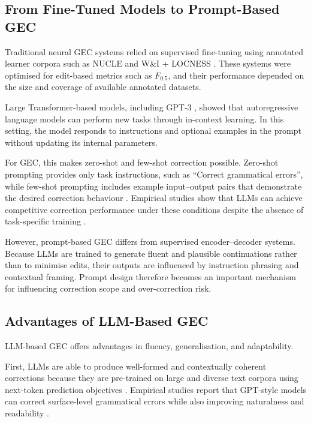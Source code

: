 \subsection{From Fine-Tuned Models to Prompt-Based GEC}

Traditional neural GEC systems relied on supervised fine-tuning using annotated learner corpora such as NUCLE and W\&I + LOCNESS \cite{ng-etal-2014-conll,bryant-etal-2019-bea}. These systems were optimised for edit-based metrics such as $F_{0.5}$, and their performance depended on the size and coverage of available annotated datasets.

Large Transformer-based models, including GPT-3 \cite{NEURIPS2020_1457c0d6}, showed that autoregressive language models can perform new tasks through in-context learning. In this setting, the model responds to instructions and optional examples in the prompt without updating its internal parameters.

For GEC, this makes zero-shot and few-shot correction possible. Zero-shot prompting provides only task instructions, such as ``Correct grammatical errors'', while few-shot prompting includes example input--output pairs that demonstrate the desired correction behaviour \cite{NEURIPS2020_1457c0d6}. Empirical studies show that LLMs can achieve competitive correction performance under these conditions despite the absence of task-specific training \cite{loem2023exploringeffectivenessgpt3grammatical}.

However, prompt-based GEC differs from supervised encoder--decoder systems. Because LLMs are trained to generate fluent and plausible continuations rather than to minimise edits, their outputs are influenced by instruction phrasing and contextual framing. Prompt design therefore becomes an important mechanism for influencing correction scope and over-correction risk.

\subsection{Advantages of LLM-Based GEC}

LLM-based GEC offers advantages in fluency, generalisation, and adaptability.

First, LLMs are able to produce well-formed and contextually coherent corrections because they are pre-trained on large and diverse text corpora using next-token prediction objectives \cite{NEURIPS2020_1457c0d6}. Empirical studies report that GPT-style models can correct surface-level grammatical errors while also improving naturalness and readability \cite{loem2023exploringeffectivenessgpt3grammatical}.

